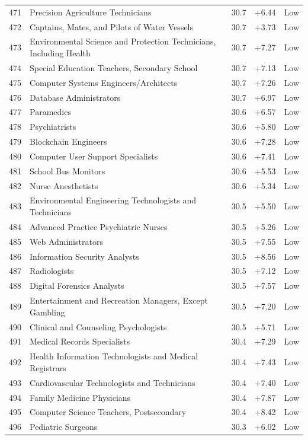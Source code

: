 {\begin{longtable}{rp{7cm}ccc}
471 & Precision Agriculture Technicians & 30.7 & +6.44 & Low \\
472 & Captains, Mates, and Pilots of Water Vessels & 30.7 & +3.73 & Low \\
473 & Environmental Science and Protection Technicians, Including Health & 30.7 & +7.27 & Low \\
474 & Special Education Teachers, Secondary School & 30.7 & +7.13 & Low \\
475 & Computer Systems Engineers/Architects & 30.7 & +7.26 & Low \\
476 & Database Administrators & 30.7 & +6.97 & Low \\
477 & Paramedics & 30.6 & +6.57 & Low \\
478 & Psychiatrists & 30.6 & +5.80 & Low \\
479 & Blockchain Engineers & 30.6 & +7.28 & Low \\
480 & Computer User Support Specialists & 30.6 & +7.41 & Low \\
481 & School Bus Monitors & 30.6 & +5.53 & Low \\
482 & Nurse Anesthetists & 30.6 & +5.34 & Low \\
483 & Environmental Engineering Technologists and Technicians & 30.5 & +5.50 & Low \\
484 & Advanced Practice Psychiatric Nurses & 30.5 & +5.26 & Low \\
485 & Web Administrators & 30.5 & +7.55 & Low \\
486 & Information Security Analysts & 30.5 & +8.56 & Low \\
487 & Radiologists & 30.5 & +7.12 & Low \\
488 & Digital Forensics Analysts & 30.5 & +7.57 & Low \\
489 & Entertainment and Recreation Managers, Except Gambling & 30.5 & +7.20 & Low \\
490 & Clinical and Counseling Psychologists & 30.5 & +5.71 & Low \\
491 & Medical Records Specialists & 30.4 & +7.29 & Low \\
492 & Health Information Technologists and Medical Registrars & 30.4 & +7.43 & Low \\
493 & Cardiovascular Technologists and Technicians & 30.4 & +7.40 & Low \\
494 & Family Medicine Physicians & 30.4 & +7.87 & Low \\
495 & Computer Science Teachers, Postsecondary & 30.4 & +8.42 & Low \\
496 & Pediatric Surgeons & 30.3 & +6.02 & Low \\

\end{longtable}}

